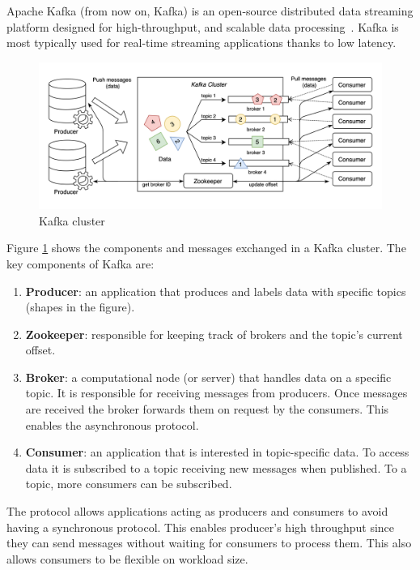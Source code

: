 Apache Kafka (from now on, Kafka) is an open-source distributed data streaming platform designed for high-throughput, and scalable data processing~\cite{krepsKafkaDistributedMessaging2011}. Kafka is most typically used for real-time streaming applications thanks to low latency. 

\begin{figure}[!ht]
    \begin{center}
      \includegraphics[width=\textwidth]{figures/2-background/kafka.png}
    \end{center}
    \caption{Kafka cluster}
    \label{fig:kafka}
\end{figure}

Figure \ref{fig:kafka} shows the components and messages exchanged in a Kafka cluster. The key components of Kafka are:
\begin{enumerate}
    \item \textbf{Producer}: an application that produces and labels data with specific topics (shapes in the figure).
    \item \textbf{Zookeeper}: responsible for keeping track of brokers and the topic's current offset.
    \item \textbf{Broker}: a computational node (or server) that handles data on a specific topic. It is responsible for receiving messages from producers. Once messages are received the broker forwards them on request by the consumers. This enables the asynchronous protocol.
    \item \textbf{Consumer}: an application that is interested in topic-specific data. To access data it is subscribed to a topic receiving new messages when published. To a topic, more consumers can be subscribed.
\end{enumerate}

The protocol allows applications acting as producers and consumers to avoid having a synchronous protocol. This enables producer's high throughput since they can send messages without waiting for consumers to process them. This also allows consumers to be flexible on workload size.

